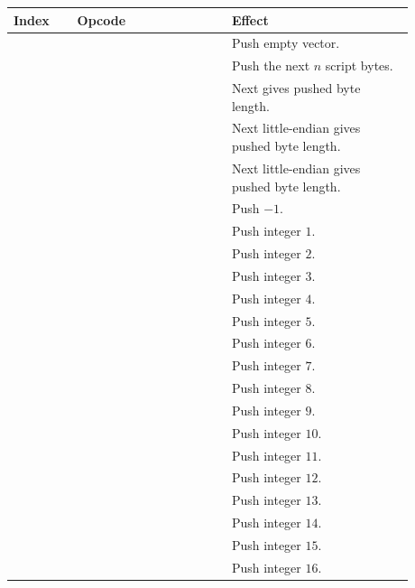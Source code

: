 \begin{longtable}{@{}L{0.14\linewidth}L{0.34\linewidth}L{0.40\linewidth}@{}}
\toprule
Index & Opcode & Effect \\
\midrule
{} &  & Push empty vector. \\
 &  & Push the next \(n\) script bytes. \\
 &  & Next  gives pushed byte length. \\
 &  & Next little-endian  gives pushed byte length. \\
 &  & Next little-endian  gives pushed byte length. \\
 &  & Push \(-1\). \\
 &  & Push integer \(1\). \\
 &  & Push integer \(2\). \\
 &  & Push integer \(3\). \\
 &  & Push integer \(4\). \\
 &  & Push integer \(5\). \\
 &  & Push integer \(6\). \\
 &  & Push integer \(7\). \\
 &  & Push integer \(8\). \\
 &  & Push integer \(9\). \\
 &  & Push integer \(10\). \\
 &  & Push integer \(11\). \\
 &  & Push integer \(12\). \\
 &  & Push integer \(13\). \\
 &  & Push integer \(14\). \\
 &  & Push integer \(15\). \\
 &  & Push integer \(16\). \\
\bottomrule
\end{longtable}

